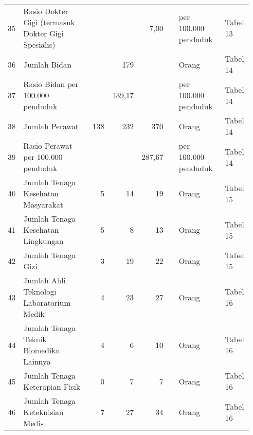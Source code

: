 \begin{small}
\begin{longtable}{rY{12em}rrrrY{5em}Y{5em}}
	 35 & Rasio Dokter Gigi (termasuk Dokter Gigi Spesialis)                          &        &        &               7,00 &          & per 100.000 penduduk           & Tabel 13 \\
	 36 & Jumlah Bidan                                                                &        &    179 &                    &          & Orang                          & Tabel 14 \\
	 37 & Rasio Bidan per 100.000 penduduk                                            &        & 139,17 &                    &          & per 100.000 penduduk           & Tabel 14 \\
	 38 & Jumlah Perawat                                                              &    138 &    232 &                370 &          & Orang                          & Tabel 14 \\
	 39 & Rasio Perawat per 100.000 penduduk                                          &        &        &             287,67 &          & per 100.000 penduduk           & Tabel 14 \\
	 40 & Jumlah Tenaga Kesehatan Masyarakat                                          &      5 &     14 &                 19 &          & Orang                          & Tabel 15 \\
	 41 & Jumlah Tenaga Kesehatan Lingkungan                                          &      5 &      8 &                 13 &          & Orang                          & Tabel 15 \\
	 42 & Jumlah Tenaga Gizi                                                          &      3 &     19 &                 22 &          & Orang                          & Tabel 15 \\
	 43 & Jumlah Ahli Teknologi Laboratorium Medik                                    &      4 &     23 &                 27 &          & Orang                          & Tabel 16 \\
	 44 & Jumlah Tenaga Teknik Biomedika Lainnya                                      &      4 &      6 &                 10 &          & Orang                          & Tabel 16 \\
	 45 & Jumlah Tenaga Keterapian Fisik                                              &      0 &      7 &                  7 &          & Orang                          & Tabel 16 \\
	 46 & Jumlah Tenaga Keteknisian Medis                                             &      7 &     27 &                 34 &          & Orang                          & Tabel 16 \\

\end{longtable}
\end{small}
